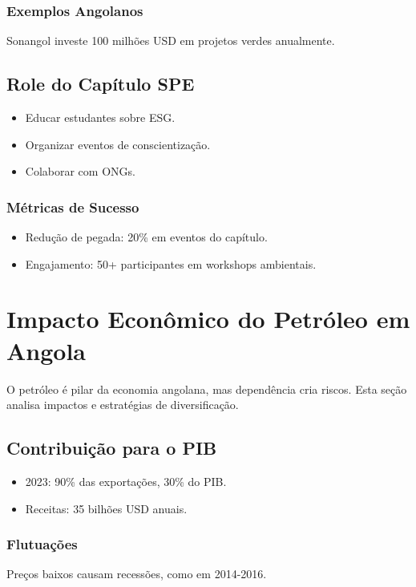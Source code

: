 \documentclass[12pt]{article}
\begin{document}
\subsubsection{Exemplos Angolanos}
Sonangol investe 100 milhões USD em projetos verdes anualmente.

\subsection{Role do Capítulo SPE}
\begin{itemize}
    \item Educar estudantes sobre ESG.
    \item Organizar eventos de conscientização.
    \item Colaborar com ONGs.
\end{itemize}

\subsubsection{Métricas de Sucesso}
\begin{itemize}
    \item Redução de pegada: 20\% em eventos do capítulo.
    \item Engajamento: 50+ participantes em workshops ambientais.
\end{itemize}

\section{Impacto Econômico do Petróleo em Angola}

O petróleo é pilar da economia angolana, mas dependência cria riscos. Esta seção analisa impactos e estratégias de diversificação.

\subsection{Contribuição para o PIB}
\begin{itemize}
    \item 2023: 90\% das exportações, 30\% do PIB.
    \item Receitas: 35 bilhões USD anuais.
\end{itemize}

\subsubsection{Flutuações}
Preços baixos causam recessões, como em 2014-2016.
\end{document}
